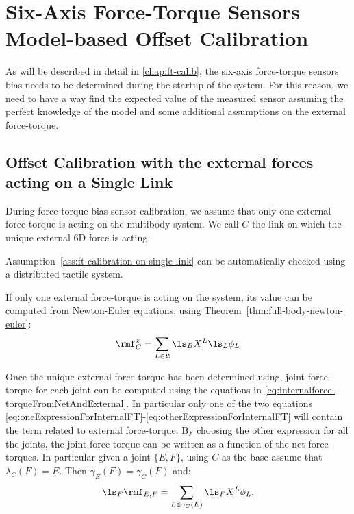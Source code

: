 \section{Six-Axis Force-Torque Sensors Model-based Offset Calibration} 
\label{sec:model-based-ft-offset-calibration}
As will be described in detail in \ref{chap:ft-calib}, the six-axis force-torque sensors bias needs to be determined during the startup of the system. For this reason, we need to have a way find the expected value of the measured sensor assuming the perfect knowledge of the model and some additional assumptions on the external force-torque. 

\subsection{Offset Calibration with the external forces acting on a Single Link}
\begin{assumption}
\label{ass:ft-calibration-on-single-link}
During force-torque bias sensor calibration, we assume that only one external force-torque is acting on the multibody system. We call $C$ the link on which the unique external 6D force is acting.
\end{assumption}

\begin{remark}
Assumption~\ref{ass:ft-calibration-on-single-link} can be automatically checked using a distributed tactile system. 
\end{remark}

If only one external force-torque is acting on the system, its value can be computed from Newton-Euler equations, using Theorem~\ref{thm:full-body-newton-euler}:
\begin{equation}
\label{eq:ft-external-force-torque-single-body}
\rmf^x_C = \sum_{L \in \mathfrak{L}}  \ls_B X^L \ls_L \phi_L
\end{equation}

Once the unique external force-torque has been determined using, joint force-torque for each joint can be computed using the equations in \eqref{eq:internalforce-torqueFromNetAndExternal}. In particular only one of the two equations \eqref{eq:oneExpressionForInternalFT}-\eqref{eq:otherExpressionForInternalFT} will contain the term related to external force-torque. By choosing the other expression for all the joints, the joint force-torque can be written as a function of the net force-torques. In particular given a joint $\{ E,F \}$, using $C$ as the base assume that $\lambda_C(F) = E$. Then $\gamma_E(F) = \gamma_C(F)$ and:
\begin{equation}
\ls_F \rmf_{E,F} = \sum_{L \in \gamma_C(E)} \ls_F X^L \phi_L .
\end{equation}

